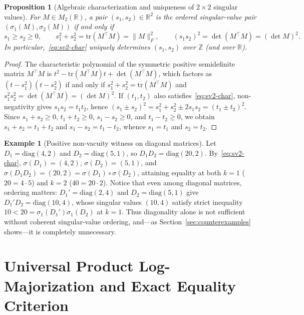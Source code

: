 \documentclass[11pt,a4paper]{article}
\newtheorem{proposition}[theorem]{Proposition}
\theoremstyle{definition}
\newtheorem{example}[theorem]{Example}
\newcommand{\R}{\mathbb{R}}
\newcommand{\Z}{\mathbb{Z}}
\newcommand{\diag}{\mathrm{diag}}
\newcommand{\tr}{\mathrm{tr}}
\begin{document}
\begin{proposition}[Algebraic characterization and uniqueness of $2\times 2$ singular values]\label{prop:sv2-unique}
For $M \in M_2(\R)$, a pair $(s_1, s_2) \in \R^2$ is the ordered singular-value pair $(\sigma_1(M), \sigma_2(M))$ if and only if
\begin{equation}\label{eq:sv2-char}
  s_1 \ge s_2 \ge 0, \qquad
  s_1^2 + s_2^2 = \tr(M^\top M) = \|M\|_F^2, \qquad
  (s_1 s_2)^2 = \det(M^\top M) = (\det M)^2.
\end{equation}
In particular,~\eqref{eq:sv2-char} uniquely determines $(s_1, s_2)$ over $\Z$ (and over $\R$).
\end{proposition}

\begin{proof}
The characteristic polynomial of the symmetric positive semidefinite matrix $M^\top M$ is $t^2 - \tr(M^\top M)t + \det(M^\top M)$, which factors as $(t - s_1^2)(t - s_2^2)$ if and only if $s_1^2 + s_2^2 = \tr(M^\top M)$ and $s_1^2 s_2^2 = \det(M^\top M) = (\det M)^2$. If $(t_1, t_2)$ also satisfies~\eqref{eq:sv2-char}, non-negativity gives $s_1 s_2 = t_1 t_2$, hence $(s_1 \pm s_2)^2 = s_1^2 + s_2^2 \pm 2 s_1 s_2 = (t_1 \pm t_2)^2$. Since $s_1 + s_2 \ge 0$, $t_1 + t_2 \ge 0$, $s_1 - s_2 \ge 0$, and $t_1 - t_2 \ge 0$, we obtain $s_1 + s_2 = t_1 + t_2$ and $s_1 - s_2 = t_1 - t_2$, whence $s_1 = t_1$ and $s_2 = t_2$.
\end{proof}

\begin{example}[Positive non-vacuity witness on diagonal matrices]\label{ex:diag-witness}
Let $D_1 = \diag(4, 2)$ and $D_2 = \diag(5, 1)$, so $D_1 D_2 = \diag(20, 2)$. By~\eqref{eq:sv2-char}, $\sigma(D_1) = (4, 2)$, $\sigma(D_2) = (5, 1)$, and $\sigma(D_1 D_2) = (20, 2) = \sigma(D_1)\circ\sigma(D_2)$, attaining equality at both $k = 1$ ($20 = 4 \cdot 5$) and $k = 2$ ($40 = 20 \cdot 2$). Notice that even among diagonal matrices, ordering matters: $D_1' = \diag(2, 4)$ and $D_2 = \diag(5, 1)$ give $D_1' D_2 = \diag(10, 4)$, whose singular values $(10, 4)$ satisfy strict inequality $10 < 20 = \sigma_1(D_1')\sigma_1(D_2)$ at $k = 1$. Thus diagonality alone is not sufficient without coherent singular-value ordering, and---as Section~\ref{sec:counterexamples} shows---it is completely unnecessary.
\end{example}

\section{Universal Product Log-Majorization and Exact Equality Criterion}
\end{document}
